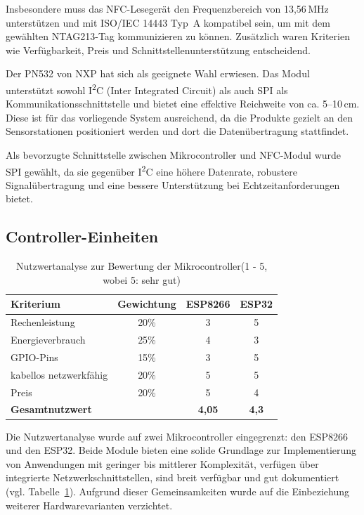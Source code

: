 Insbesondere muss das NFC-Lesegerät den Frequenzbereich von 13{,}56\,MHz unterstützen und mit ISO/IEC 14443 Typ~A kompatibel sein, um mit dem gewählten NTAG213-Tag kommunizieren zu können. Zusätzlich waren Kriterien wie Verfügbarkeit, Preis und Schnittstellenunterstützung entscheidend.

Der PN532 von NXP hat sich als geeignete Wahl erwiesen. Das Modul unterstützt sowohl I\textsuperscript{2}C (Inter Integrated Circuit) als auch SPI als Kommunikationsschnittstelle und bietet eine effektive Reichweite von ca. 5–10\,cm. Diese ist für das vorliegende System ausreichend, da die Produkte gezielt an den Sensorstationen positioniert werden und dort die Datenübertragung stattfindet.

Als bevorzugte Schnittstelle zwischen Mikrocontroller und NFC-Modul wurde SPI gewählt, da sie gegenüber I\textsuperscript{2}C eine höhere Datenrate, robustere Signalübertragung und eine bessere Unterstützung bei Echtzeitanforderungen bietet.


\subsection{Controller-Einheiten}

\begin{table}[H]
	\centering
	\caption{Nutzwertanalyse zur Bewertung der Mikrocontroller(1 - 5, wobei 5: sehr gut)}
	\label{tab:nwa_ctrl}
	\begin{tabular}{|l|c|c|c|}
		\hline
		\textbf{Kriterium} & \textbf{Gewichtung} & \textbf{ESP8266} & \textbf{ESP32} \\ \hline
		Rechenleistung          & 20\% & 3 & 5 \\ \hline
		Energieverbrauch        & 25\% & 4 & 3 \\ \hline
 		GPIO-Pins				& 15\% & 3 & 5 \\ \hline
		kabellos netzwerkfähig	& 20\% & 5 & 5 \\ \hline
		Preis                   & 20\% & 5 & 4 \\ \hline
		\textbf{Gesamtnutzwert} &       & \textbf{4,05} & \textbf{4,3} \\ \hline
	\end{tabular}
\end{table}

Die Nutzwertanalyse wurde auf zwei Mikrocontroller eingegrenzt: den ESP8266 und den ESP32. Beide Module bieten eine solide Grundlage zur Implementierung von Anwendungen mit geringer bis mittlerer Komplexität, verfügen über integrierte Netzwerkschnittstellen, sind breit verfügbar und gut dokumentiert (vgl. Tabelle~\ref{tab:nwa_ctrl}). Aufgrund dieser Gemeinsamkeiten wurde auf die Einbeziehung weiterer Hardwarevarianten verzichtet.

